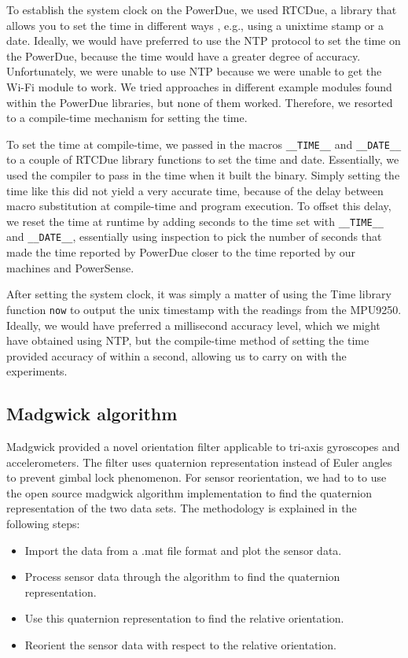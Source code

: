 \documentclass[journal]{IEEEtranTIE}
\begin{document}
To establish the system clock on the PowerDue, we used RTCDue, a library that
allows you to set the time in different ways \cite{RTCDue}, e.g., using a
unixtime stamp or a date. Ideally, we would have preferred to use the NTP
protocol to set the time on the PowerDue, because the time would have a greater
degree of accuracy. Unfortunately, we were unable to use NTP because we were
unable to get the Wi-Fi module to work. We tried approaches in different example
modules found within the PowerDue libraries, but none of them worked. Therefore,
we resorted to a compile-time mechanism for setting the time.

To set the time at compile-time, we passed in the macros \texttt{\_\_TIME\_\_}
and \texttt{\_\_DATE\_\_} to a couple of RTCDue library functions to set the
time and date. Essentially, we used the compiler to pass in the time when it
built the binary. Simply setting the time like this did not yield a very
accurate time, because of the delay between macro substitution at compile-time
and program execution. To offset this delay, we reset the time at runtime by
adding seconds to the time set with \texttt{\_\_TIME\_\_} and
\texttt{\_\_DATE\_\_}, essentially using inspection to pick the number of
seconds that made the time reported by PowerDue closer to the time reported by
our machines and PowerSense.

After setting the system clock, it was simply a matter of using the Time library
function \texttt{now} \cite{TimeLib} to output the unix timestamp with the
readings from the MPU9250. Ideally, we would have preferred a millisecond
accuracy level, which we might have obtained using NTP, but the compile-time
method of setting the time provided accuracy of within a second, allowing us to
carry on with the experiments.

\subsection{Madgwick algorithm}

Madgwick provided a novel orientation filter applicable to tri-axis gyroscopes
and accelerometers. The filter uses quaternion representation instead of Euler
angles to prevent gimbal lock phenomenon. For sensor reorientation, we had to to
use the open source madgwick algorithm implementation to find the quaternion
representation of the two data sets. The methodology is explained in the
following steps:

\begin{itemize}
\item Import the data from a .mat file format and plot the sensor data.
\item Process sensor data through the algorithm to find the quaternion
      representation.
\item Use this quaternion representation to find the relative orientation.
\item Reorient the sensor data with respect to the relative orientation.
\end{itemize}
\end{document}
